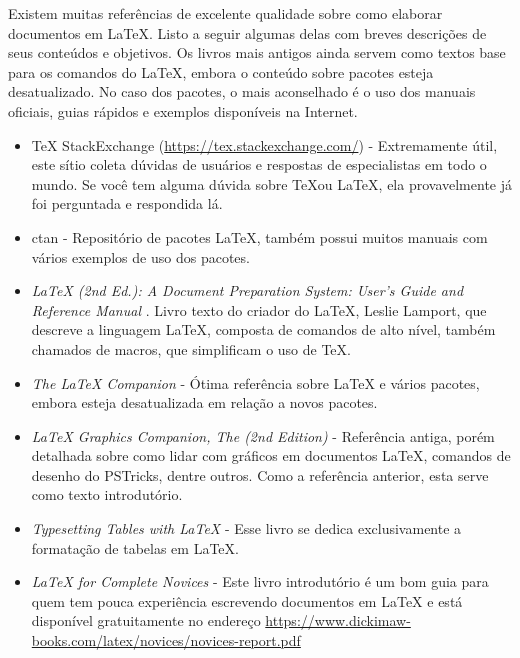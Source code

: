Existem muitas referências de excelente qualidade sobre como elaborar documentos em \LaTeX . Listo a seguir algumas delas com breves descrições de seus conteúdos e objetivos. Os livros mais antigos ainda servem como textos base para os comandos do \LaTeX{}, embora o conteúdo sobre pacotes esteja desatualizado. No caso dos pacotes, o mais aconselhado é o uso dos manuais oficiais, guias rápidos e exemplos disponíveis na Internet.

\begin{itemize}
	\item \TeX{} StackExchange (\url{https://tex.stackexchange.com/}) - Extremamente útil, este sítio coleta dúvidas de usuários e respostas de especialistas em todo o mundo. Se você tem alguma dúvida sobre \TeX ou \LaTeX , ela provavelmente já foi perguntada e respondida lá.
	
	\item \gls{ctan} - Repositório de pacotes \LaTeX , também possui muitos manuais com vários exemplos de uso dos pacotes.
	
	\item \textit{\LaTeX{} (2nd Ed.): A Document Preparation System: User's Guide and Reference Manual} \parencite{Lamport1994}. Livro texto do criador do \LaTeX{}, Leslie Lamport, que descreve a linguagem \LaTeX{}, composta de comandos de alto nível, também chamados de macros, que simplificam o uso de \TeX{}.
	
	\item \textit{The \LaTeX{} Companion} \parencite{Mittelbach1999} - Ótima referência sobre \LaTeX{} e vários pacotes, embora esteja desatualizada em relação a novos pacotes.
	
	\item \textit{\LaTeX{} Graphics Companion, The (2nd Edition)} \parencite{Goosens2007} - Referência antiga, porém detalhada sobre como lidar com gráficos em documentos \LaTeX{}, comandos de desenho do PSTricks, dentre outros. Como a referência anterior, esta serve como texto introdutório. 
	
	\item \textit{Typesetting Tables with \LaTeX{}} \parencite{Voss2011} - Esse livro se dedica exclusivamente a formatação de tabelas em \LaTeX{}.
	
	\item \textit{\LaTeX{} for Complete Novices} \parencite{Talbot2012} - Este livro introdutório é um bom guia para quem tem pouca experiência escrevendo documentos em \LaTeX{} e está disponível gratuitamente no endereço \url{https://www.dickimaw-books.com/latex/novices/novices-report.pdf} 
	

\end{itemize}
